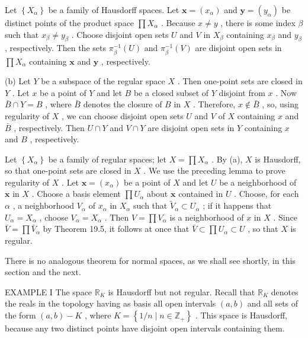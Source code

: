 \documentclass[10pt]{article}
\begin{document}
Let \(\left\{  {X}_{\alpha }\right\}\) be a family of Hausdorff spaces. Let \(\mathbf{x} = \left( {x}_{\alpha }\right)\) and \(\mathbf{y} = \left( {y}_{\alpha }\right)\) be distinct points of the product space \(\prod {X}_{\alpha }\) . Because \(x \neq  y\) , there is some index \(\beta\) such that \({x}_{\beta } \neq  {y}_{\beta }\) . Choose disjoint open sets \(U\) and \(V\) in \({X}_{\beta }\) containing \({x}_{\beta }\) and \({y}_{\beta }\) , respectively. Then the sets \({\pi }_{\beta }^{-1}\left( U\right)\) and \({\pi }_{\beta }^{-1}\left( V\right)\) are disjoint open sets in \(\prod {X}_{\alpha }\) containing \(\mathbf{x}\) and \(\mathbf{y}\) , respectively.

(b) Let \(Y\) be a subspace of the regular space \(X\) . Then one-point sets are closed in \(Y\) . Let \(x\) be a point of \(Y\) and let \(B\) be a closed subset of \(Y\) disjoint from \(x\) . Now \(\bar{B} \cap  Y = B\) , where \(\bar{B}\) denotes the closure of \(B\) in \(X\) . Therefore, \(x \notin  \bar{B}\) , so, using regularity of \(X\) , we can choose disjoint open sets \(U\) and \(V\) of \(X\) containing \(x\) and \(\bar{B}\) , respectively. Then \(U \cap  Y\) and \(V \cap  Y\) are disjoint open sets in \(Y\) containing \(x\) and \(B\) , respectively.

Let \(\left\{  {X}_{\alpha }\right\}\) be a family of regular spaces; let \(X = \prod {X}_{\alpha }\) . By (a), \(X\) is Hausdorff, so that one-point sets are closed in \(X\) . We use the preceding lemma to prove regularity of \(X\) . Let \(\mathbf{x} = \left( {x}_{\alpha }\right)\) be a point of \(X\) and let \(U\) be a neighborhood of \(\mathbf{x}\) in \(X\) . Choose a basis element \(\prod {U}_{\alpha }\) about \(\mathbf{x}\) contained in \(U\) . Choose, for each \(\alpha\) , a neighborhood \({V}_{\alpha }\) of \({x}_{\alpha }\) in \({X}_{\alpha }\) such that \({\widetilde{V}}_{\alpha } \subset  {U}_{\alpha }\) ; if it happens that \({U}_{\alpha } = {X}_{\alpha }\) , choose \({V}_{\alpha } = {X}_{\alpha }\) . Then \(V = \prod {V}_{\alpha }\) is a neighborhood of \(x\) in \(X\) . Since \(\bar{V} = \prod {\bar{V}}_{\alpha }\) by Theorem 19.5, it follows at once that \(\bar{V} \subset  \prod {U}_{\alpha } \subset  U\) , so that \(X\) is regular.

There is no analogous theorem for normal spaces, as we shall see shortly, in this section and the next.

EXAMPLE I The space \({\mathbb{R}}_{K}\) is Hausdorff but not regular. Recall that \({\mathbb{R}}_{K}\) denotes the reals in the topology having as basis all open intervals \(\left( {a,b}\right)\) and all sets of the form \(\left( {a,b}\right)  - K\) , where \(K = \left\{  {1/n \mid  n \in  {\mathbb{Z}}_{ + }}\right\}\) . This space is Hausdorff, because any two distinct points have disjoint open intervals containing them.
\end{document}
